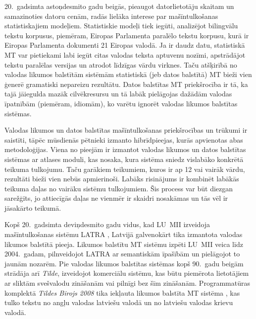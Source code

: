 \begin{multicols}{2}
20.~gadsimta astoņdesmito gadu beigās, pieaugot datorlietotāju skaitam un samazinoties datoru cenām, radās lielāka interese par mašīntulkošanas statistiskajiem modeļiem. 
Statistiskie modeļi tiek iegūti, analizējot bilingvālu tekstu korpusus, piemēram, Eiropas Parlamenta paralēlo tekstu korpusu, kurā ir Eiropas Parlamenta dokumenti 21 Eiropas valodā. 
Ja ir daudz datu, statistiskā MT var pietiekami labi iegūt citas valodas teksta aptuvenu nozīmi, apstrādājot tekstu paralēlas versijas un atrodot līdzīgas vārdu virknes. 
Taču atšķirībā no valodas likumos balstītām sistēmām statistiskā (jeb datos balstītā) MT bieži vien ģenerē gramatiski nepareizu rezultātu. 
Datos balstītas MT priekšrocība ir tā, ka tajā jāiegulda mazāk cilvēkresursu un tā labāk pielāgojas dažādām valodas īpatnībām (piemēram, idiomām), ko varētu ignorēt valodas likumos balstītas sistēmas. 


Valodas likumos un datos balstītas mašīntulkošanas priekšrocības un trūkumi ir saistīti, tāpēc mūsdienās pētnieki izmanto hibrīdpieejas, kurās apvienotas abas metodoloģijas. 
Viena no pieejām ir izmantot valodas likumos un datos balstītas sistēmas ar atlases moduli, kas nosaka, kura sistēma sniedz vislabāko konkrētā teikuma tulkojumu. 
Taču garākiem teikumiem, kuros ir ap 12 vai vairāk vārdu, rezultāti bieži vien nebūs apmierinoši. 
Labāks risinājums ir kombinēt labākās teikuma daļas no vairāku sistēmu tulkojumiem. 
Šis process var būt diezgan sarežģīts, jo attiecīgās daļas ne vienmēr ir skaidri nosakāmas un tās vēl ir jāsakārto teikumā. 

Kopš 20.~gadsimta deviņdesmito gadu vidus, kad LU~MII izveidoja mašīntulkošanas sistēmu LATRA \cite{Meta23}, Latvijā galvenokārt tika izmantota valodas likumos balstītā pieeja.
Likumos balstītu MT sistēmu izpēti LU~MII veica līdz 2004.~gadam, pilnveidojot LATRA ar semantiskām īpašībām un pielāgojot to jaunām nozarēm.
Pie valodas likumos balstītas sistēmas kopš 90.~gadu beigām strādāja arī \textit{Tilde}, izveidojot komerciālu sistēmu, kas būtu piemērota lietotājiem ar sliktām svešvalodu zināšanām vai pilnīgi bez šīm zināšanām.
Programmatūras komplektā \textit{Tildes Birojs 2008} tika iekļauta likumos balstīta MT sistēma \cite{Meta24}, kas tulko tekstu no angļu valodas latviešu valodā un no latviešu valodas krievu valodā. 


\end{multicols}
